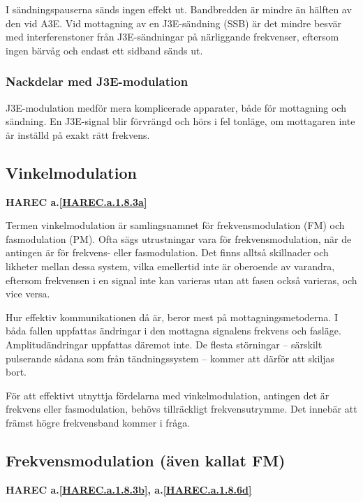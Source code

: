 I sändningspauserna sänds ingen effekt ut. Bandbredden är mindre än hälften av
den vid A3E. Vid mottagning av en J3E-sändning (SSB) är det mindre besvär med
interferenstoner från J3E-sändningar på närliggande frekvenser, eftersom ingen
bärvåg och endast ett sidband sänds ut.

\subsubsection{Nackdelar med J3E-modulation}
J3E-modulation medför mera komplicerade apparater, både för mottagning och
sändning. En J3E-signal blir förvrängd och hörs i fel tonläge, om mottagaren
inte är inställd på exakt rätt frekvens.

\subsection{Vinkelmodulation}
\textbf{HAREC a.\ref{HAREC.a.1.8.3a}\label{myHAREC.a.1.8.3a}}

Termen vinkelmodulation är samlingsnamnet för frekvensmodulation (FM) och
fasmodulation (PM). Ofta sägs utrustningar vara för frekvensmodulation, när de
antingen är för frekvens- eller fasmodulation. Det finns alltså skillnader och
likheter mellan dessa system, vilka emellertid inte är oberoende av varandra,
eftersom frekvensen i en signal inte kan varieras utan att fasen också
varieras, och vice versa.

Hur effektiv kommunikationen då är, beror mest på mottagningsmetoderna. I båda
fallen uppfattas ändringar i den mottagna signalens frekvens och fasläge.
Amplitudändringar uppfattas däremot inte. De flesta störningar -- särskilt
pulserande sådana som från tändningssystem -- kommer att därför att skiljas bort.

För att effektivt utnyttja fördelarna med vinkelmodulation, antingen det är
frekvens eller fasmodulation, behövs tillräckligt frekvensutrymme. Det innebär
att främst högre frekvensband kommer i fråga.

\subsection{Frekvensmodulation (även kallat FM)}
\textbf{HAREC
  a.\ref{HAREC.a.1.8.3b}\label{myHAREC.a.1.8.3b},
  a.\ref{HAREC.a.1.8.6d}\label{myHAREC.a.1.8.6d}
}

